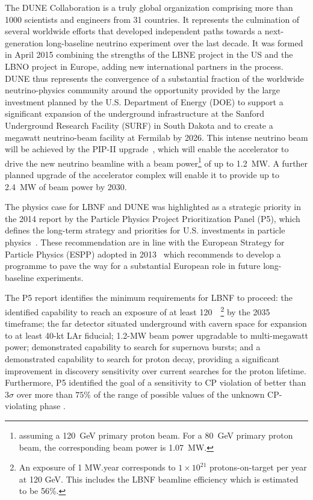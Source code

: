 The DUNE Collaboration is a truly global organization comprising more than 1000 scientists and engineers from 31 countries. It represents
the culmination of several worldwide efforts that developed independent paths towards a next-generation long-baseline neutrino experiment over the last decade.
It was formed in April 2015 combining the strengths of the LBNE project in the US and the LBNO project in Europe, adding new international 
partners in the process. DUNE thus represents the convergence of a substantial fraction of the worldwide neutrino-physics community around the 
opportunity provided by the large investment planned by the U.S. Department of Energy (DOE) to support 
a significant expansion of the underground infrastructure at the Sanford Underground Research 
Facility (SURF) in South Dakota and to create a megawatt neutrino-beam facility at Fermilab by 2026. 
This intense neutrino beam will be achieved by the PIP-II upgrade~\cite{pip2-2013}, 
which will enable the accelerator to drive the new neutrino beamline with a beam power\footnote{assuming a \SI{120}{\GeV} primary proton beam. 
For a \SI{80}{\GeV} primary proton beam, the corresponding beam power is \SI{1.07}{\MW}.} of up to \SI{1.2}{\MW}. A further planned upgrade 
of the accelerator complex will enable it to provide up to \SI{2.4}{\MW} of beam power by 2030.  

The physics case for LBNF and DUNE was highlighted as a strategic priority in the 2014 report
by the Particle Physics Project Prioritization Panel (P5), which defines the long-term strategy and priorities for U.S. investments 
in particle physics~\cite{p5report2014}. These recommendation are in line with the 
European Strategy for Particle Physics (ESPP) adopted in 2013~\cite{ESPP-2012} which recommends to develop 
a programme to pave the way for a substantial European role in future long-baseline experiments.

The P5 report identifies the  minimum requirements for LBNF to proceed: 
the identified capability to reach an exposure of at least 120~\ktMWyr{}~\footnote{An exposure
of 1 MW.year corresponds to $1\times 10^{21}$ protons-on-target per year at 120 GeV. This includes the LBNF beamline efficiency which is estimated to be 56\%.}  by the 2035 timeframe;
the far detector situated underground with cavern space for expansion to at least 40-kt LAr fiducial;
1.2-MW beam power upgradable to multi-megawatt power;
demonstrated capability to search for supernova bursts; and
a demonstrated capability to search for proton decay, 
providing a significant improvement in discovery sensitivity over current searches for the proton lifetime.
Furthermore, P5 identified the goal of a sensitivity to CP violation of better than 3$\sigma$ over more than $75\%$ 
of the range of possible values of the unknown CP-violating phase \deltacp.

